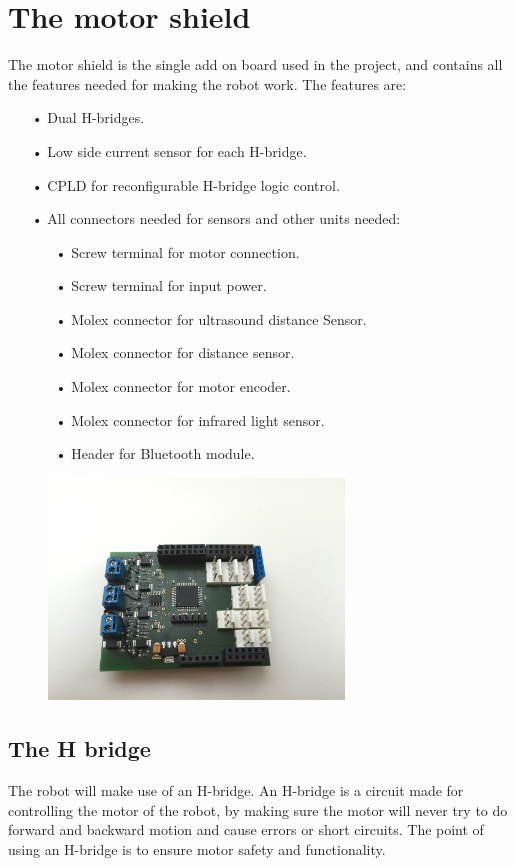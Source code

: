 \section{The motor shield}
The motor shield is the single add on board used in the project, and contains all the features needed for making the robot work.
The features are:
\begin{enumerate}
	\item[•]Dual H-bridges.
	\item[•]Low side current sensor for each H-bridge.
	\item[•]CPLD for reconfigurable H-bridge logic control.
	\item[•]All connectors needed for sensors and other units needed:
	\begin{enumerate}
		\item[•]Screw terminal for motor connection.
		\item[•]Screw terminal for input power.
		\item[•]Molex connector for ultrasound distance Sensor.
		\item[•]Molex connector for  distance sensor.
		\item[•]Molex connector for motor encoder.
		\item[•]Molex connector for infrared light sensor.
		\item[•]Header for Bluetooth module.
	\end{enumerate}
\end{enumerate}

\begin{figure}[!ht]
	\centering
	\includegraphics[width=0.7\textwidth]{figures/motorShield.jpg}
	\caption{}
	\label{Motorshield}
\end{figure}

\subsection{The H bridge}
The robot will make use of an H-bridge. An H-bridge is a circuit made for controlling the motor of the robot, by making sure the motor will never try to do forward and backward motion  and cause errors or short circuits. The point of using an H-bridge is to ensure motor safety and functionality.

